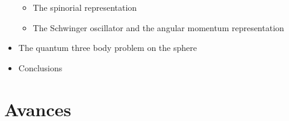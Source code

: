 \documentclass[xcolor=dvipsnames]{beamer}
\begin{document}
\begin{frame}[allowframebreaks]
\begin{itemize}
\begin{itemize}
\item The spinorial representation\\
\item The Schwinger oscillator and the angular momentum representation\\
\end{itemize}
\item The quantum three body problem on the sphere\\
\item Conclusions\\
\end{itemize}
\end{frame}
\section{Avances}
\end{document}
